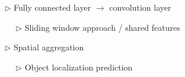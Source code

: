 \documentclass[landscape,a0paper,fontscale=0.292]{baposter}
\begin{document}
\begin{poster}
{\vspace{-3mm}
\begin{minipage}[t]{8cm}

$\triangleright$ Fully connected layer $\rightarrow$ convolution layer 

~~ $\triangleright$ Sliding window approach / shared features

\end{minipage} \hfill 
\begin{minipage}[t]{8cm}

$\triangleright$ Spatial aggregation 

~~ $\triangleright$ Object localization prediction

\end{minipage}

}

\end{poster}
\end{document}
